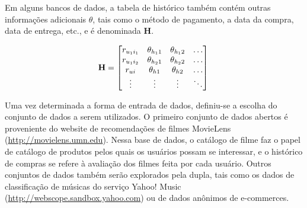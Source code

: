 Em alguns bancos de dados, a tabela de histórico também contém outras informações adicionais $\theta$, tais como o método de pagamento, a data da compra, data de entrega, etc., e é denominada $\mathbf{H}$.

\begin{equation} 
\mathbf{H} =
\begin{bmatrix} 
 r_{u_1 i_1} &  \theta_{h_1 1} &  \theta_{h_1 2} & \dots   \\
 r_{u_1 i_2} &  \theta_{h_2 1} &  \theta_{h_2 2} & \dots   \\
 r_{u i} &  \theta_{h 1} &  \theta_{h 2} & \dots   \\
 \vdots &  \vdots &  \vdots  & \ddots   \\
 \end{bmatrix} \\
\end{equation}

Uma vez determinada a forma de entrada de dados, definiu-se a escolha do conjunto de dados a serem utilizados. O primeiro conjunto de dados abertos é proveniente do website de recomendações de filmes MovieLens (\url{http://movielens.umn.edu}). Nessa base de dados, o catálogo de filme faz o papel de catálogo de produtos pelos quais os usuários possam se interessar, e o histórico de compras se refere à avaliação dos filmes feita por cada usuário. Outros conjuntos de dados também serão  explorados pela dupla, tais como os dados de classificação de músicas do serviço Yahoo! Music (\url{http://webscope.sandbox.yahoo.com}) ou de dados anônimos de e-commerces.
